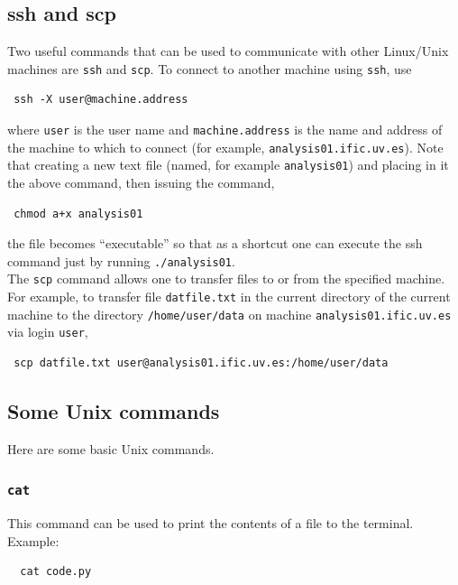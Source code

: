 \documentclass[10pt]{article}
\begin{document}
\subsection{ssh and scp}\label{ss_app_sshscp}
\noindent Two useful commands that can be used to communicate with other Linux/Unix machines are \verb|ssh| and \verb|scp|.  To connect to another machine using \verb|ssh|, use

\begin{verbatim}
 ssh -X user@machine.address
\end{verbatim}

\noindent where \verb|user| is the user name and \verb|machine.address| is the name and address of the machine to which to connect (for example, \verb|analysis01.ific.uv.es|).  Note that 
creating a new text file (named, for example \verb|analysis01|) and placing in it the above command, then issuing the command,

\begin{verbatim}
 chmod a+x analysis01
\end{verbatim}

\noindent the file becomes ``executable'' so that as a shortcut one can execute the ssh command just by running \verb|./analysis01|.\\

\noindent The \verb|scp| command allows one to transfer files to or from the specified machine.  For example, to transfer file \verb|datfile.txt| in the current directory of the current machine to the directory 
\verb|/home/user/data| on machine \verb|analysis01.ific.uv.es| via login \verb|user|,

\begin{verbatim}
 scp datfile.txt user@analysis01.ific.uv.es:/home/user/data
\end{verbatim}

\subsection{Some Unix commands}\label{ss_app_commands}
\noindent Here are some basic Unix commands.

\subsubsection{\texttt{cat}}
\noindent This command can be used to print the contents of a file to the terminal.  Example: 

\begin{verbatim}
  cat code.py
\end{verbatim}
\end{document}

